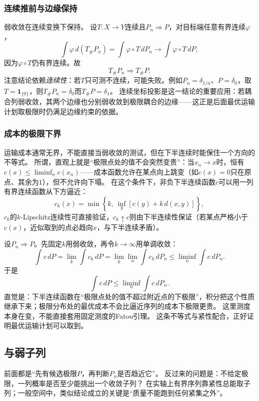 \subsubsection{连续推前与边缘保持}

弱收敛在连续变换下保持。
设$T:X\to Y$连续且$P_n\Rightarrow P$，对目标端任意有界连续$\varphi$，
\[
 \int\varphi\,d(T_\#P_n)=\int\varphi\circ T\,dP_n\to\int\varphi\circ T\,dP,
\]
因为$\varphi\circ T$仍有界连续。故
\[
 T_\#P_n\Rightarrow T_\#P.
\]
注意结论依赖\emph{连续性}：若$T$只可测不连续，可能失败。例如$P_n=\delta_{1/n}$、$P=\delta_0$，取$T=\mathbf 1_{\{0\}}$，则$T_\#P_n=\delta_0$而$T_\#P=\delta_1$。
连续坐标投影是这一结论的重要应用：若耦合列弱收敛，其两个边缘也分别弱收敛到极限耦合的边缘——这正是后面最优运输计划取极限时仍满足边缘约束的依据。

\subsubsection{成本的极限下界}

运输成本通常无界，不能直接当弱收敛的测试，但在下半连续时能保住一个方向的不等式。
所谓，直观上就是“极限点处的值不会突然变贵”：当$x_n\to x$时，恒有$c(x)\leq\liminf_n c(x_n)$——成本函数允许在某点向上跳变（如$c(x)=0$只在原点、其余为$1$），但不允许向下塌。
在这个条件下，非负下半连续函数$c$可以用一列有界连续函数从下方逼近：
\[
 c_k(x)=\min\left\{k,\ \inf_y[c(y)+k\,d(x,y)]\right\},
\]
$c_k$的$k$-Lipschitz连续性可直接验证，$c_k\uparrow c$则由下半连续性保证（若某点严格小于$c(x)$，近似取到的点必趋向$x$，与下半连续矛盾）。

设$P_n\Rightarrow P$。先固定$k$用弱收敛，再令$k\to\infty$用单调收敛：
\[
 \int c\,dP=\lim_k\int c_k\,dP
 =\lim_k\lim_n\int c_k\,dP_n
 \leq\liminf_n\int c\,dP_n.
\]
于是
\begin{equation}
 \int c\,dP\leq\liminf_n\int c\,dP_n.
 \label{eq:measure-lsc-portmanteau}
\end{equation}
直觉是：下半连续函数在“极限点处的值不超过附近点的下极限”，积分把这个性质继承下来；极限分布处的最优成本不会比逼近序列的成本下极限更贵。
这里测度本身在变，不能直接套用固定测度的Fatou引理。
这条不等式与紧性配合，正好证明最优运输计划可以取到。

\subsection{与弱子列}
\label{sec:measure-tightness}

前面都是“先有候选极限$P$，再判断$P_n$是否趋近它”。
反过来的问题是：不给定极限，一列概率是否至少能挑出一个收敛子列？
在实轴上有界序列靠紧性总能取子列；一般空间中，类似结论成立的关键是“质量不能跑到任何紧集之外”。

